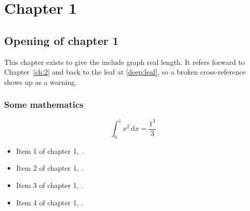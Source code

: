 \chapter{Chapter 1}
\label{ch:1}
\section{Opening of chapter 1}
This chapter exists to give the include graph real length. It refers
forward to Chapter~\ref{ch:2} and back to the leaf
at \ref{deep:leaf}, so a broken cross-reference shows up as a warning.

\subsection{Some mathematics}
\begin{equation}
  \int_0^{1} x^{2} \, \mathrm{d}x = \frac{1^{3}}{3}
\end{equation}

\begin{itemize}
  \item Item 1 of chapter 1, .
  \item Item 2 of chapter 1, .
  \item Item 3 of chapter 1, .
  \item Item 4 of chapter 1, .
\end{itemize}



